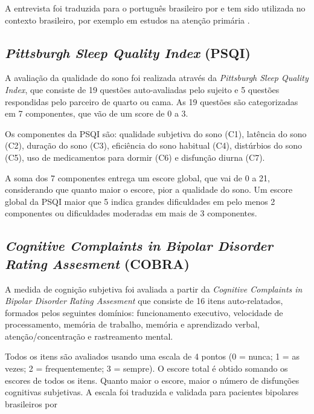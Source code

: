 \documentclass[chapter=TITLE,oneside,12pt,a4paper,english,brazil]{abntex2} %
\begin{document}
        A entrevista foi traduzida para o português brasileiro por
        \textcite{amorim_mini_2000} e tem sido utilizada no contexto
        brasileiro, por exemplo em estudos na atenção primária
        \parencite{de_azevedo_marques_validity_2008}.

    \subsection{\textit{Pittsburgh Sleep Quality Index} (PSQI)}\label{sec:psqi}

        A avaliação da qualidade do sono foi realizada através da
        \textit{Pittsburgh Sleep Quality Index}, que consiste de 19 questões
        auto-avaliadas pelo sujeito e 5 questões respondidas pelo parceiro de
        quarto ou cama. 
        As 19 questões são categorizadas em 7 componentes, que vão de um score
        de 0 a 3.
        \parencite{bertolazi_validation_2011}

        Os componentes da PSQI são: qualidade subjetiva do sono (C1),
        latência do sono (C2), duração do sono (C3),
        eficiência do sono habitual (C4), distúrbios do sono (C5),
        uso de medicamentos para dormir (C6) e disfunção diurna (C7).

        A soma dos 7 componentes entrega um escore global, que vai de 0 a 21,
        considerando que quanto maior o escore, pior a qualidade do sono.
        Um escore global da PSQI maior que 5 indica grandes dificuldades
        em pelo menos 2 componentes ou dificuldades moderadas em mais de 3 componentes.


    \subsection{\textit{Cognitive Complaints in Bipolar Disorder Rating Assesment} (COBRA)}\label{sec:cobra}

    A medida de cognição subjetiva foi avaliada a partir da
    \textit{Cognitive Complaints in Bipolar Disorder Rating Assesment}
    que consiste de 16 itens auto-relatados, formados pelos seguintes domínios:
    funcionamento executivo, velocidade de processamento, memória de trabalho,
    memória e aprendizado verbal, atenção/concentração e rastreamento mental.

    Todos os itens são avaliados usando uma escala de 4 pontos
    (0 = nunca; 1 = as vezes; 2 = frequentemente; 3 = sempre).
    O escore total é obtido somando os escores de todos os itens.
    Quanto maior o escore, maior o número de disfunções cognitivas subjetivas.
    A escala foi traduzida e validada para pacientes bipolares brasileiros
    por \textcite{lima_validity_2018}
\end{document}

